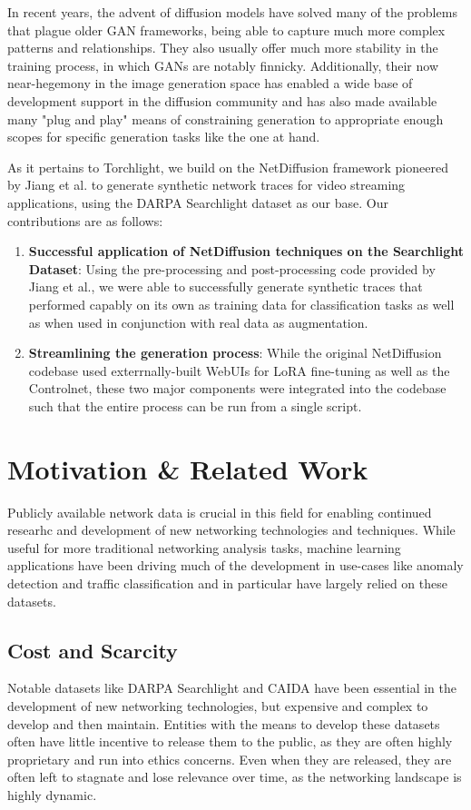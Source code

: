 \documentclass[acmsmall, nonacm]{acmart}
\begin{document}
In recent years, the advent of diffusion models have solved many of the
problems that plague older GAN frameworks, being able to capture much
more complex patterns and relationships. They also usually offer much more
stability in the training process, in which GANs are notably finnicky.
Additionally, their now near-hegemony in the image generation space has
enabled a wide base of development support in the diffusion community 
and has also made available many "plug and play"
means of constraining generation to appropriate enough scopes for specific generation
tasks like the one at hand.

As it pertains to Torchlight, we build on the NetDiffusion framework pioneered
by Jiang et al. \cite{Jiang2024} to generate synthetic network traces for video
streaming applications, using the DARPA Searchlight dataset \cite{Ardi2022} as
our base. Our contributions are as follows:

\begin{enumerate}
  \item \textbf{Successful application of NetDiffusion techniques on the Searchlight Dataset}:
  Using the pre-processing and post-processing code provided by Jiang et al., we were able to
  successfully generate synthetic traces that performed capably on its own as training
  data for classification tasks as well as when used in conjunction with real data 
  as augmentation.
  \item \textbf{Streamlining the generation process}: While the original NetDiffusion codebase
  used exterrnally-built WebUIs for LoRA fine-tuning as well as the Controlnet, 
  these two major components were integrated into the codebase such that the 
  entire process can be run from a single script.
\end{enumerate}

\section{Motivation \& Related Work}
Publicly available network data is crucial in this field for enabling continued
researhc and development of new networking technologies and techniques. While useful for
more traditional networking analysis tasks, machine learning applications have been driving
much of the development in use-cases like anomaly detection and traffic classification and 
in particular have largely relied on these datasets.

\subsection{Cost and Scarcity}
Notable datasets like DARPA Searchlight and CAIDA have been essential 
in the development of new networking technologies, but expensive and complex
to develop and then maintain. Entities with the means to develop these datasets
often have little incentive to release them to the public, as they are often
highly proprietary and run into ethics concerns. Even when they are released, 
they are often left to stagnate and lose relevance over time, as the networking
landscape is highly dynamic.
\end{document}
